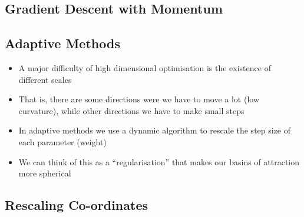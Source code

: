 
\begin{slide}
\section{Gradient Descent with Momentum}

\pb\pause{}
\begin{center}
  \pause
\end{center}
\end{slide}


\begin{slide}
  \section{Adaptive Methods}

  \begin{PauseHighLight}
    \begin{itemize}
    \item A major difficulty of high dimensional optimisation is the
      existence of different scales\pause
    \item That is, there are some directions were we have to move a
      lot (low curvature), while other directions we have to make small
      steps\pause
    \item In adaptive methods we use a dynamic algorithm to rescale
      the step size of each parameter (weight)\pause
    \item We can think of this as a ``regularisation'' that makes our
      basins of attraction more spherical\pause
    \end{itemize}
  \end{PauseHighLight}

\end{slide}


\begin{slide}
\section[-2]{Rescaling Co-ordinates}

\pb{}\pause{}
\begin{center}
  \pause
\end{center}
\end{slide}

